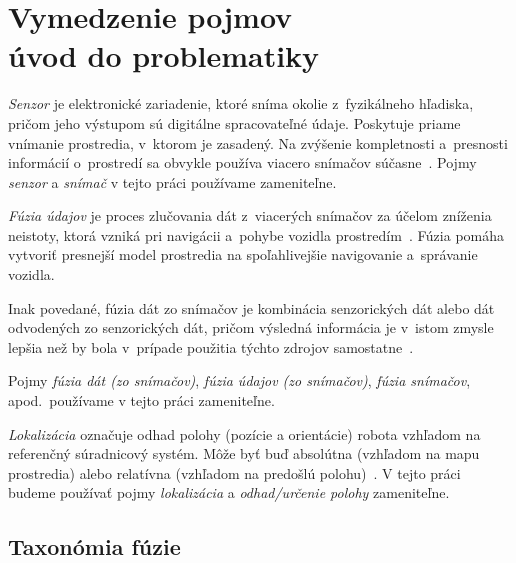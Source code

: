 \section[Vymedzenie pojmov a úvod do problematiky]{Vymedzenie pojmov\\ úvod do problematiky}

  \emph{Senzor} je elektronické zariadenie, ktoré sníma okolie z~fyzikálneho hľadiska, pričom jeho výstupom sú digitálne spracovateľné údaje. Poskytuje priame vnímanie prostredia, v~ktorom je zasadený. Na zvýšenie kompletnosti a~presnosti informácií o~prostredí sa obvykle používa viacero snímačov súčasne~\cite{kolarSurveyDatafusionTechniques2020}. Pojmy \emph{senzor} a \emph{snímač} v tejto práci používame zameniteľne.
  
  \emph{Fúzia údajov} je proces zlučovania dát z~viacerých snímačov za účelom zníženia neistoty, ktorá vzniká pri navigácii a~pohybe vozidla prostredím~\cite{tzafestas12MobileRobot2014}. Fúzia pomáha vytvoriť presnejší model prostredia na spoľahlivejšie navigovanie a~správanie vozidla. 
  
  Inak povedané, fúzia dát zo snímačov je kombinácia senzorických dát alebo dát odvodených zo senzorických dát, pričom výsledná informácia je v~istom zmysle lepšia než by bola v~prípade použitia týchto zdrojov samostatne~\cite{elmenreichIntroductionSensorFusion}.

  Pojmy \emph{fúzia dát (zo snímačov)}, \emph{fúzia údajov (zo snímačov)}, \emph{fúzia snímačov}, apod.\ používame v tejto práci zameniteľne.

  \emph{Lokalizácia} označuje odhad polohy (pozície a orientácie) robota vzhľadom na referenčný súradnicový systém. Môže byť buď absolútna (vzhľadom na mapu prostredia) alebo relatívna (vzhľadom na predošlú polohu)~\cite{thrunProbabilisticRobotics2005}. V tejto práci budeme používať pojmy \emph{lokalizácia} a \emph{odhad/určenie polohy} zameniteľne.

  \subsection{Taxonómia fúzie}
      
